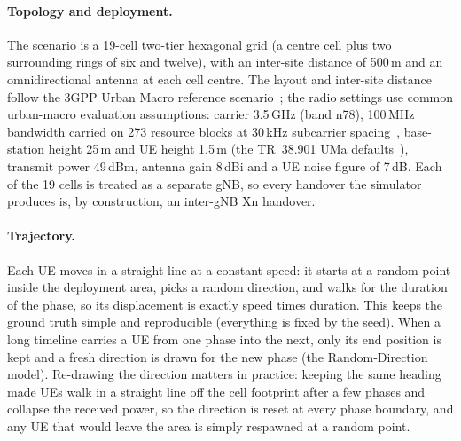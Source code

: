 \paragraph{Topology and deployment.}
The scenario is a 19-cell two-tier hexagonal grid (a centre cell plus two
surrounding rings of six and twelve), with an inter-site distance of 500\,m and
an omnidirectional antenna at each cell centre. The layout and inter-site distance follow the 3GPP Urban
Macro reference scenario~\cite{tr38913}; the radio settings use common
urban-macro evaluation assumptions: carrier 3.5\,GHz (band n78), 100\,MHz
bandwidth carried on 273 resource blocks at 30\,kHz subcarrier
spacing~\cite{ts38104}, base-station height 25\,m and UE height 1.5\,m (the
TR~38.901 UMa defaults~\cite{tr38901}), transmit power 49\,dBm, antenna gain
8\,dBi and a UE noise figure of 7\,dB. Each
of the 19 cells is treated as a separate gNB, so every handover the simulator
produces is, by construction, an inter-gNB Xn handover.

\paragraph{Trajectory.}
Each UE moves in a straight line at a constant speed: it starts at a random point
inside the deployment area, picks a random direction, and walks for the duration
of the phase, so its displacement is exactly speed times duration. This keeps the
ground truth simple and reproducible (everything is fixed by the seed). When a
long timeline carries a UE from one phase into the next, only its end position is
kept and a fresh direction is drawn for the new phase (the Random-Direction
model). Re-drawing the direction matters in practice: keeping the same heading
made UEs walk in a straight line off the cell footprint after a few phases and
collapse the received power, so the direction is reset at every phase boundary,
and any UE that would leave the area is simply respawned at a random point.

